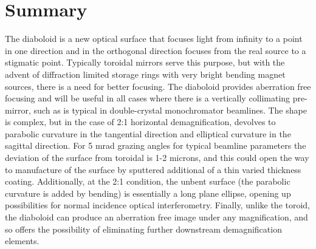 \documentclass{iucr}              %
\begin{document}



\section{Summary}
\label{sec:summary}

The diaboloid is a new optical surface that focuses light from infinity to a point in one direction and in the orthogonal direction focuses from the real source to a stigmatic point.  Typically toroidal mirrors serve this purpose, but with the advent of diffraction limited storage rings with very bright bending magnet sources, there is a need for better focusing. The diaboloid provides aberration free focusing and will be useful in all cases where there is a vertically collimating pre-mirror, such as is typical in double-crystal monochromator beamlines. The shape is complex, but in the case of 2:1 horizontal demagnification, devolves to parabolic curvature in the tangential direction and elliptical curvature in the sagittal direction. For 5 mrad grazing angles for typical beamline parameters the deviation of the surface from toroidal is 1-2 microns, and this could open the way to manufacture of the surface by sputtered additional of a thin varied thickness coating.  Additionally, at the 2:1 condition, the unbent surface (the parabolic curvature is added by bending) is essentially a long plane ellipse, opening up possibilities for normal incidence optical interferometry.  Finally, unlike the toroid, the diaboloid can produce an aberration free image under any magnification, and so offers the possibility of eliminating further downstream demagnification elements. 
\end{document}
